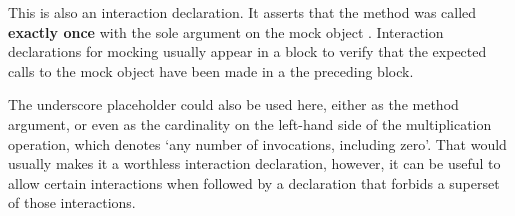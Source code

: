 This is also an interaction declaration. It asserts that
the method  was called \textbf{exactly once} with
the sole argument  on
the mock object .
Interaction declarations for mocking usually appear in a  block
to verify that the expected calls to the mock object
have been made in a the preceding  block.

The underscore placeholder could also be used here,
either as the method argument,
or even as the cardinality
on the left-hand side of the multiplication operation,
which denotes `any number of invocations, including zero'.
That would usually makes it a worthless interaction declaration,
however, it can be useful to allow certain interactions when followed by
a declaration that forbids a superset of those interactions.
\autocite[Chapter: Interaction Based Testing - Mocking - Strict Mocking]{SpockFrameworkDoc}

